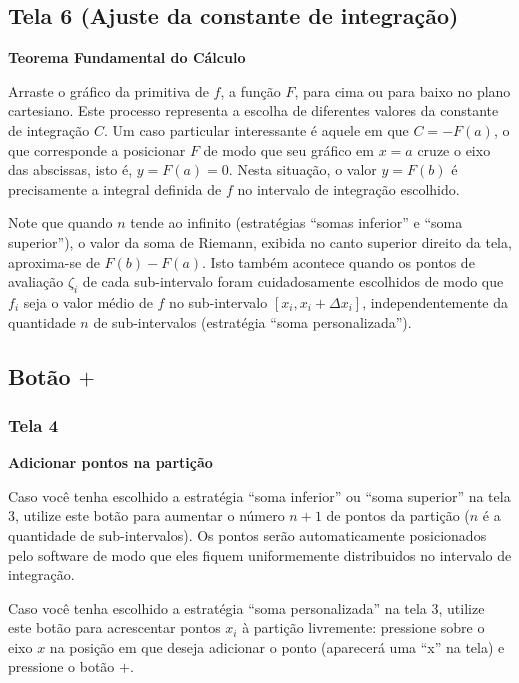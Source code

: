 \documentclass[a4paper,10pt]{scrartcl}
\begin{document}
  \subsection*{Tela 6 (Ajuste da constante de integração)}
    \textbf{Teorema Fundamental do Cálculo}
    
    Arraste o gráfico da primitiva de $f$, a função $F$, para cima ou para baixo no plano cartesiano. Este processo representa a escolha de diferentes valores da constante de integração $C$. Um caso particular interessante é aquele em que $C = -F(a)$, o que corresponde a posicionar $F$ de modo que seu gráfico em $x = a$ cruze o eixo das abscissas, isto é, $y = F(a) = 0$. Nesta situação, o valor $y = F(b)$ é precisamente a integral definida de $f$ no intervalo de integração escolhido.
    
    Note que quando $n$ tende ao infinito (estratégias ``somas inferior'' e ``soma superior''), o valor da soma de Riemann, exibida no canto superior direito da tela, aproxima-se de $F(b)-F(a)$. Isto também acontece quando os pontos de avaliação $\zeta_i$ de cada sub-intervalo foram cuidadosamente escolhidos de modo que $f_i$ seja o valor médio de $f$ no sub-intervalo $[x_i,x_i+\Delta x_i]$, independentemente da quantidade $n$ de sub-intervalos (estratégia ``soma personalizada'').

    
  \subsection*{Botão $+$}
    \subsubsection*{Tela 4}    
    \textbf{Adicionar pontos na partição}
    
    Caso você tenha escolhido a estratégia ``soma inferior'' ou ``soma superior'' na tela 3, utilize este botão para aumentar o número $n+1$ de pontos da partição ($n$ é a quantidade de sub-intervalos). Os pontos serão automaticamente posicionados pelo software de modo que eles fiquem uniformemente distribuidos no intervalo de integração.
    
    Caso você tenha escolhido a estratégia ``soma personalizada'' na tela 3, utilize este botão para acrescentar pontos $x_i$ à partição livremente: pressione sobre o eixo $x$ na posição em que deseja adicionar o ponto (aparecerá uma ``x'' na tela) e pressione o botão $+$.
    
    \newpage
    
\end{document}
